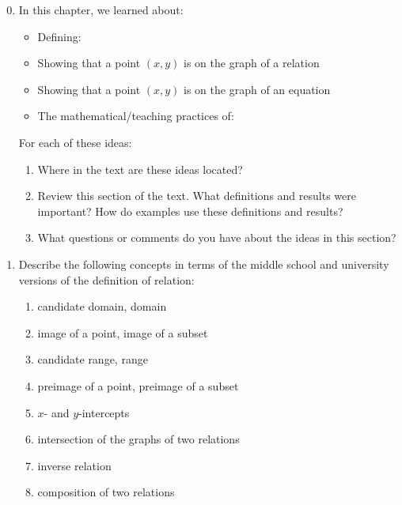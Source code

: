 \documentclass[11pt]{article}
\theoremstyle{definition}
\begin{document}
\begin{enumerate}
\setcounter{enumi}{-1}
\item In this chapter, we learned about:
 	\begin{itemize}
	\item Defining:
	\item Showing that a point $(x,y)$ is on the graph of a relation
	\item Showing that a point $(x,y)$ is on the graph of an equation
	\item The mathematical/teaching practices of:
	\end{itemize}

For each of these ideas: 
	\begin{enumerate}
	\item Where in the text are these ideas located?
	\item Review this section of the text. What definitions and results were important? How do examples use these definitions and results?
	\item What questions or comments do you have about the ideas in this section?
	\end{enumerate}
	
	
\item 
Describe the following concepts in terms of the middle school and university versions of the definition of relation: 
		\begin{enumerate}
		\item candidate domain, domain
		\item image of a point, image of a subset
		\item candidate range, range
		\item preimage of a point, preimage of a subset
		\item $x$- and $y$-intercepts 
		\item intersection of the graphs of two relations
		\item inverse relation
		\item composition of two relations
		\end{enumerate}  
		

\end{enumerate}
\end{document}
